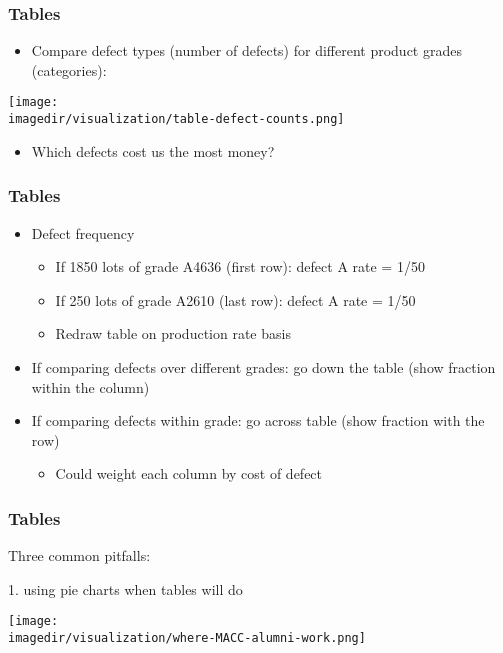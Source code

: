 \begin{frame}\frametitle{Tables}
	\begin{itemize}
		\item	Compare defect types (number of defects) for different product grades (categories): 
	\end{itemize}
	\begin{center}
		\texttt{[image: \\imagedir/visualization/table-defect-counts.png]}
	\end{center}
	\begin{itemize}
		\item	Which defects cost us the most money? 
	\end{itemize}
\end{frame}

\begin{frame}\frametitle{Tables}
	\begin{itemize}
		\item	Defect frequency 
		\begin{itemize}
			\item	If 1850 lots of grade A4636 (first row): defect A rate = 1/50 
			\item	If 250 lots of grade A2610 (last row): defect A rate = 1/50 
			\item	Redraw table on production rate basis 
		\end{itemize}
		\item	If comparing defects over different grades: go down the table (show fraction within the column) 
		\item	If comparing defects within grade: go across table (show fraction with the row) 
		\begin{itemize}
			\item	Could weight each column by cost of defect 
		\end{itemize}
	\end{itemize}
\end{frame}

\begin{frame}\frametitle{Tables}
	Three common pitfalls:
	
	1. using pie charts when tables will do 
	\begin{center}
		\texttt{[image: \\imagedir/visualization/where-MACC-alumni-work.png]}
	\end{center}
\end{frame}

% 	


